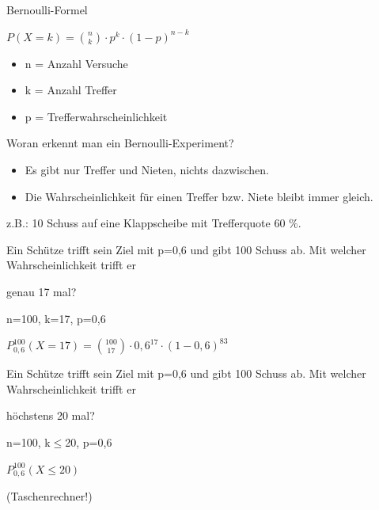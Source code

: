 \documentclass[paper=a6,landscape,ngerman,twoside=true,fontsize=12pt]{scrartcl}
\begin{document}
\begin{frage}
	Bernoulli-Formel
	
\end{frage}
\begin{antwort}
	\LARGE
	$P(X=k)=\binom{n}{k} \cdot p^k \cdot (1-p)^{n-k}$
	\large
	\begin{itemize}
		\item n = Anzahl Versuche
		\item k = Anzahl Treffer
		\item p = Trefferwahrscheinlichkeit
	\end{itemize}	
\end{antwort}
\begin{frage}
	Woran erkennt man ein Bernoulli-Experiment?
	
\end{frage}
\begin{antwort}
	\begin{itemize}
		\item Es gibt nur Treffer und Nieten, nichts dazwischen.
		\item Die Wahrscheinlichkeit für einen Treffer bzw. Niete bleibt immer gleich.
	\end{itemize}
	
	z.B.: 10 Schuss auf eine Klappscheibe mit Trefferquote 60 $\%$.
\end{antwort}
\begin{frage}
	\large
	Ein Schütze trifft sein Ziel mit p=0,6 und gibt 100 Schuss ab. Mit welcher Wahrscheinlichkeit trifft er 
	
	\LARGE 
	genau 17 mal?
	
\end{frage}
\begin{antwort}
	n=100, k=17, p=0,6
	
	\bigskip
	$P^{100}_{0,6}(X=17)=\binom{100}{17} \cdot 0,6^{17} \cdot (1-0,6)^{83}$
	
\end{antwort}
\begin{frage}
	\large
	Ein Schütze trifft sein Ziel mit p=0,6 und gibt 100 Schuss ab. Mit welcher Wahrscheinlichkeit trifft er 
	
	\LARGE 
	höchstens 20 mal?
	
\end{frage}
\begin{antwort}
	n=100, k$\leq$20, p=0,6
	
	\bigskip
	$P^{100}_{0,6}(X\leq 20)$
	
	(Taschenrechner!)
	
\end{antwort}
\end{document}
